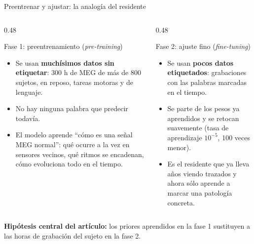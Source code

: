 \documentclass[aspectratio=169,10pt]{beamer}
\newcommand{\term}[1]{\textbf{\color{deepgreen}#1}}
\newcommand{\eng}[1]{{\itshape\color{muted}#1}}
\begin{document}
\begin{frame}[c]{Preentrenar y ajustar: la analogía del residente}
  \small
  \begin{columns}[t,totalwidth=\linewidth]
    \begin{column}{0.48\linewidth}
      \begin{block}{Fase 1: preentrenamiento (\eng{pre-training})}
        \begin{itemize}
          \item Se usan \term{muchísimos datos sin etiquetar}: 300 h de MEG de más de 800 sujetos, en reposo, tareas motoras y de lenguaje.
          \item No hay ninguna palabra que predecir todavía.
          \item El modelo aprende ``cómo es una señal MEG normal'': qué ocurre a la vez en sensores vecinos, qué ritmos se encadenan, cómo evoluciona todo en el tiempo.
        \end{itemize}
      \end{block}
    \end{column}
    \begin{column}{0.48\linewidth}
      \begin{exampleblock}{Fase 2: ajuste fino (\eng{fine-tuning})}
        \begin{itemize}
          \item Se usan \term{pocos datos etiquetados}: grabaciones con las palabras marcadas en el tiempo.
          \item Se parte de los pesos ya aprendidos y se retocan suavemente (tasa de aprendizaje $10^{-5}$, 100 veces menor).
          \item Es el residente que ya lleva años viendo trazados y ahora sólo aprende a marcar una patología concreta.
        \end{itemize}
      \end{exampleblock}
    \end{column}
  \end{columns}
  \vspace{2mm}
  \centering\small
  \term{Hipótesis central del artículo:} los priores aprendidos en la fase 1 sustituyen a las horas de grabación del sujeto en la fase 2.
\end{frame}
\end{document}
